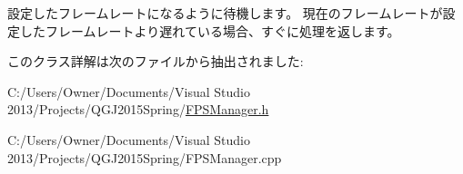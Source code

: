 設定したフレームレートになるように待機します。 現在のフレームレートが設定したフレームレートより遅れている場合、すぐに処理を返します。 



このクラス詳解は次のファイルから抽出されました\+:\begin{DoxyCompactItemize}
\item 
C\+:/\+Users/\+Owner/\+Documents/\+Visual Studio 2013/\+Projects/\+Q\+G\+J2015\+Spring/\hyperlink{_f_p_s_manager_8h}{F\+P\+S\+Manager.\+h}\item 
C\+:/\+Users/\+Owner/\+Documents/\+Visual Studio 2013/\+Projects/\+Q\+G\+J2015\+Spring/F\+P\+S\+Manager.\+cpp\end{DoxyCompactItemize}
